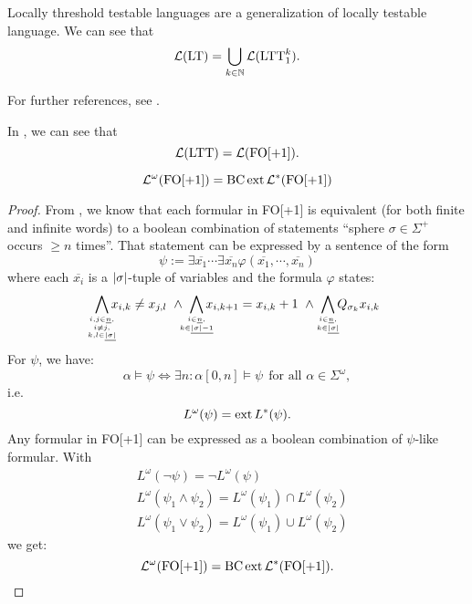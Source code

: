 Locally threshold testable languages are a generalization of locally testable language. We can see that
\[  \mathcal{L}(\textup{\textrm{LT}}) = \bigcup_{k\in\mathbb{N}} \mathcal{L}(\text{LTT}^k_1) . \]

For further references, see \cite[IV.3]{FinAutLogR109}.

In \cite[IV.3.3]{FinAutLogR109}, we can see that
\[  \mathcal{L}(\text{LTT}) = \mathcal{L}(\mathrm{FO[+1]}). \]

\begin{theorem}
\[ \mathcal{L}^\omega (\mathrm{FO[+1]}) = \operatorname{BC} \operatorname{ext} \mathcal{L}^*(\mathrm{FO[+1]}) \]
\begin{proof}
From \cite[Theorem 4.8]{LangAutLogicR102}, we know that each formular in FO[+1] is equivalent (for both finite and infinite words) to a boolean combination of statements ``sphere $\sigma \in \Sigma^+$ occurs $\geq n$ times''. That statement can be expressed by a sentence of the form
\[ \psi := \exists \overline{x_1} \dotsb \exists \overline{x_n} \varphi(\overline{x_1}, \dotsb, \overline{x_n}) \]
where each $\overline{x_i}$ is a $\left| \sigma \right|$-tuple of variables and the formula $\varphi$ states:
\[
\bigwedge_{\mathclap{i,j \in \underline{n},\atop { i \neq j,\atop k,l \in \underline{\abs{\sigma}}}}} x_{i,k} \neq x_{j,l}
\ \wedge\ \bigwedge_{\mathclap{i \in \underline{n},\atop k \in \underline{\abs{\sigma}-1}}} x_{i,k+1} = x_{i,k} + 1
\ \wedge\ \bigwedge_{\mathclap{i \in \underline{n},\atop k \in \underline{\abs{\sigma}}}} Q_{\sigma_k} x_{i,k}
\]
For $\psi$, we have:
\[ \alpha \models \psi \Leftrightarrow \exists n \colon \alpha[0,n] \models \psi \ \ \text{for all } \alpha \in \Sigma^\omega , \]
i.e.
\[ L^\omega(\psi) = \operatorname{ext} L^*(\psi) . \]
Any formular in FO[+1] can be expressed as a boolean combination of $\psi$-like formular. With
\begin{align*}
& L^\omega(\neg \psi) = \neg L^\omega(\psi) \\
& L^\omega(\psi_1 \wedge \psi_2) = L^\omega(\psi_1) \cap L^\omega(\psi_2) \\
& L^\omega(\psi_1 \vee \psi_2) = L^\omega(\psi_1) \cup L^\omega(\psi_2)
\end{align*}
we get:
\[ \mathcal{L}^\omega(\mathrm{FO[+1]}) = \operatorname{BC} \operatorname{ext} \mathcal{L}^*(\mathrm{FO[+1]}). \]
\end{proof}
\end{theorem}

